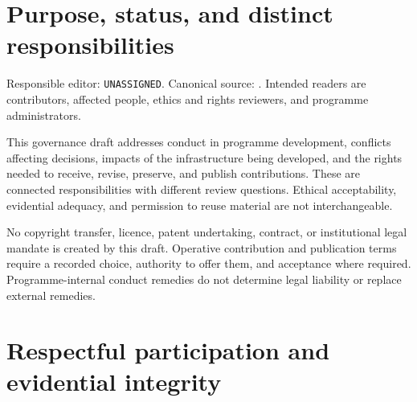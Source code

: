 \documentclass[11pt,a4paper]{article}
\begin{document}
\tableofcontents
\clearpage

\section{Purpose, status, and distinct responsibilities}
Responsible editor: \texttt{UNASSIGNED}. Canonical source: . Intended readers are contributors, affected people, ethics and rights reviewers, and programme administrators.

This governance draft addresses conduct in programme development, conflicts affecting decisions, impacts of the infrastructure being developed, and the rights needed to receive, revise, preserve, and publish contributions. These are connected responsibilities with different review questions. Ethical acceptability, evidential adequacy, and permission to reuse material are not interchangeable.

No copyright transfer, licence, patent undertaking, contract, or institutional legal mandate is created by this draft. Operative contribution and publication terms require a recorded choice, authority to offer them, and acceptance where required. Programme-internal conduct remedies do not determine legal liability or replace external remedies.



\section{Respectful participation and evidential integrity}
\end{document}
